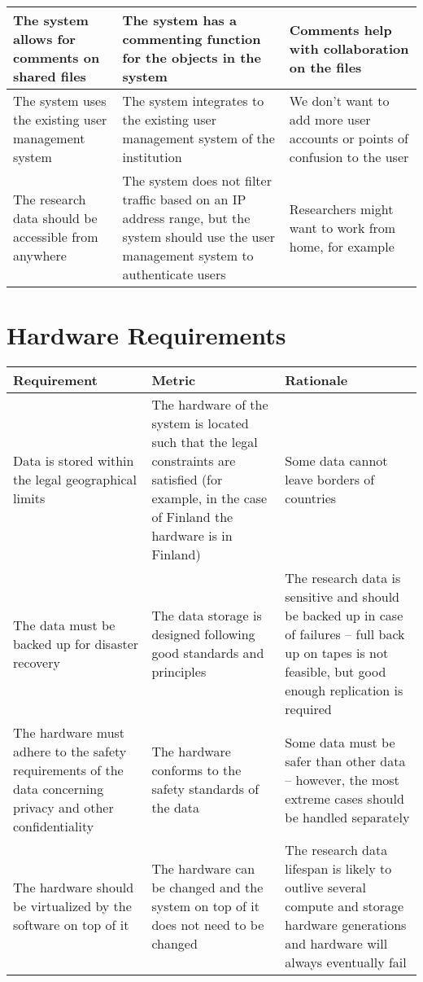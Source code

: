 \begin{tabularx}{\textwidth}{| >{\raggedright}p{3cm} | >{\raggedright}p{3cm} | X |}
    \hline
    The system allows for comments on shared files &The system has a commenting function for the objects in the system & Comments help with collaboration on the files\\
    \hline
    \rowcolor{Gray}
    The system uses the existing user management system &The system integrates to the existing user management system of the institution &We don’t want to add more user accounts or points of confusion to the user\\
    \hline
    The research data should be accessible from anywhere  &The system does not filter traffic based on an IP address range, but the system should use the user management system to authenticate users  & Researchers might want to work from home, for example\\
    \hline
\end{tabularx}

\section{Hardware Requirements}

\tabcolsep=0.11cm
\begin{tabularx}{\textwidth}{| >{\raggedright}p{3cm} | >{\raggedright}p{3cm} | X |}
    \hline
    \textbf{Requirement} & \textbf{Metric}& \textbf{Rationale} \\
    \hline
    \rowcolor{Gray}
    Data is stored within the legal geographical limits &The hardware of the system is located such that the legal constraints are satisfied (for example, in the case of Finland the hardware is in Finland) & Some data cannot leave borders of countries\\
    \hline
    The data must be backed up for disaster recovery&The data storage is designed following good standards and principles &The research data is sensitive and should be backed up in case of failures – full back up on tapes is not feasible, but good enough replication is required\\
    \hline
    \rowcolor{Gray}
    The hardware must adhere to the safety requirements of the data concerning privacy and other confidentiality &The hardware conforms to the safety standards of the data&Some data must be safer than other data – however, the most extreme cases should be handled separately\\
    \hline
    The hardware should be virtualized by the software on top of it &The hardware can be changed and the system on top of it does not need to be changed & The research data lifespan is likely to outlive several compute and storage hardware generations and hardware will always eventually fail\\
    \hline
\end{tabularx}

